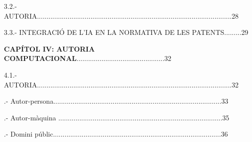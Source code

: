 \documentclass[12pt]{article}
\begin{document}
\vspace{\baselineskip}
\begin{justify}
3.2.- AUTORIA......................................................................................................28
\end{justify}\par


\vspace{\baselineskip}
\begin{justify}
3.3.- INTEGRACIÓ DE L’IA EN LA NORMATIVA DE LES PATENTS.........29
\end{justify}\par


\vspace{\baselineskip}

\vspace{\baselineskip}
\begin{justify}
\textbf{CAPÍTOL IV: AUTORIA COMPUTACIONAL}..............................................32
\end{justify}\par


\vspace{\baselineskip}

\vspace{\baselineskip}
\begin{justify}
4.1.- AUTORIA......................................................................................................32
\end{justify}\par


\vspace{\baselineskip}

\vspace{\baselineskip}
\begin{justify}
.- Autor-persona........................................................................................33
\end{justify}\par

\begin{justify}
.- Autor-màquina ......................................................................................35
\end{justify}\par

\begin{justify}
.- Domini públic........................................................................................36
\end{justify}\par
\end{document}
